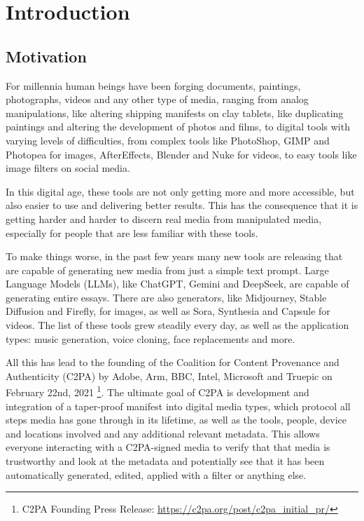 \chapter{Introduction\label{cha:chapter1}}

\section{Motivation\label{sec:moti}}

For millennia human beings have been forging documents, paintings, photographs, videos and any other type of media, ranging from analog manipulations, like altering shipping manifests on clay tablets, like duplicating paintings and altering the development of photos and films, to digital tools with varying levels of difficulties, from complex tools like PhotoShop, GIMP and Photopea for images, AfterEffects, Blender and Nuke for videos, to easy tools like image filters on social media.

In this digital age, these tools are not only getting more and more accessible, but also easier to use and delivering better results. This has the consequence that it is getting harder and harder to discern real media from manipulated media, especially for people that are less familiar with these tools.

To make things worse, in the past few years many new tools are releasing that are capable of generating new media from just a simple text prompt. Large Language Models (LLMs), like ChatGPT, Gemini and DeepSeek, are capable of generating entire essays. There are also generators, like Midjourney, Stable Diffusion and Firefly, for images, as well as Sora, Synthesia and Capsule for videos. The list of these tools grew steadily every day, as well as the application types: music generation, voice cloning, face replacements and more.

All this has lead to the founding of the Coalition for Content Provenance and Authenticity (C2PA) by Adobe, Arm, BBC, Intel, Microsoft and Truepic on February 22nd, 2021 \footnote{C2PA Founding Press Release: \url{https://c2pa.org/post/c2pa_initial_pr/}}. The ultimate goal of C2PA is development and integration of a taper-proof manifest into digital media types, which protocol all steps media has gone through in its lifetime, as well as the tools, people, device and locations involved and any additional relevant metadata. This allows everyone interacting with a C2PA-signed media to verify that that media is trustworthy and look at the metadata and potentially see that it has been automatically generated, edited, applied with a filter or anything else.

